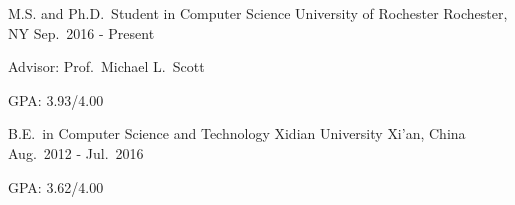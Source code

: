 

\begin{cventries}

  \cventry
    {M.S. and Ph.D.\ Student in Computer Science} %
    {University of Rochester} %
    {Rochester, NY} %
    {Sep.\ 2016 - Present} %
    {
      \begin{cvitems} %
        \item {Advisor: Prof.\ Michael L.\ Scott}
        \item {GPA: 3.93/4.00}
      \end{cvitems}
    }

  \cventry
    {B.E.\ in Computer Science and Technology} %
    {Xidian University} %
    {Xi'an, China} %
    {Aug.\ 2012 - Jul.\ 2016} %
    {
      \begin{cvitems} %
        \item {GPA: 3.62/4.00}
      \end{cvitems}
    }

\end{cventries}

